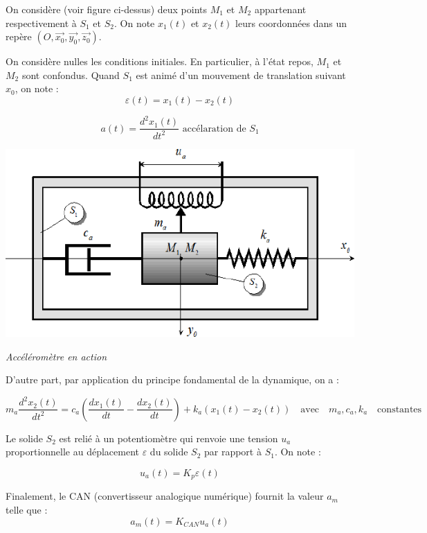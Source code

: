 \documentclass[10pt,oneside]{article}
\begin{document}
On considère (voir figure ci-dessus) deux points $M_1$ et $M_2$ appartenant respectivement à $S_1$ et $S_2$. On note
$x_1(t)$ et $x_2(t)$ leurs coordonnées dans un repère 
$\left(O,\overrightarrow{x_0},\overrightarrow{y_0},\overrightarrow{z_0}\right)$.

On considère nulles les conditions initiales. En particulier, à l’état repos, $M_1$ et $M_2$ sont confondus.
Quand $S_1$ est animé d’un mouvement de translation suivant $x_0$, on note :
\begin{equation}
\varepsilon(t)=x_1(t)-x_2(t)
\end{equation}

\begin{equation}
a(t)=\dfrac{d^2x_1(t)}{dt^2} \text{ accélaration de } S_1
\end{equation}


\begin{center}
\includegraphics[width=.5\textwidth]{png/image12.png}

\textit{Accéléromètre en action}
\end{center}

D’autre part, par application du principe fondamental de la dynamique, on a :

\begin{equation}
m_a\dfrac{d^2x_2(t)}{dt^2}=c_a\left( \dfrac{dx_1(t)}{dt} - \dfrac{dx_2(t)}{dt}\right)
+k_a\left( x_1(t)-x_2(t)\right) \quad \mathrm{avec} \quad m_a, c_a, k_a \quad \mathrm{constantes}
\end{equation}

Le solide $S_2$ est relié à un potentiomètre qui renvoie une tension $u_a$ proportionnelle au déplacement $\varepsilon$ du solide $S_2$ par rapport à $S_1$. On note : 

\begin{equation}
u_a(t)=K_p \varepsilon(t)
\end{equation}

Finalement, le CAN (convertisseur analogique numérique) fournit la valeur $a_m$ telle que :
\begin{equation}
a_m(t) = K_{CAN} u_a (t) 
\end{equation}
\end{document}
